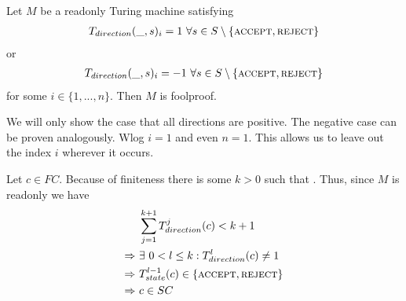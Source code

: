 \begin{Lemma} \label{turing_machines:lemma_foolproofness:lemma}
	Let $M$ be a readonly Turing machine satisfying
	\begin{align*}
		T_{direction} (\_,s)_i = 1~\forall s \in S \setminus \{\text{\scshape{accept}},\text{\scshape{reject}}\}
	\end{align*}
	or
	\begin{align*}
		T_{direction} (\_,s)_i = -1~\forall s \in S \setminus \{\text{\scshape{accept}},\text{\scshape{reject}}\}
	\end{align*}
	for some $i \in \{1,...,n\}$.
	Then $M$ is foolproof.
\end{Lemma}
\proof
We will only show the case that all directions are positive. The negative case can be proven analogously.
Wlog $i=1$ and even $n=1$. This allows us to leave out the index $i$ wherever it occurs.

Let $c \in FC$. Because of finiteness there is some $k > 0$ such that .
Thus, since $M$ is readonly we have
\begin{align*}
	&\sum_{j=1}^{k+1} T_{direction}^j (c) < k+1 \\
	\Rightarrow~&\exists~0 < l \leq k: T_{direction}^l (c) \neq 1 \\
	\Rightarrow~&T_{state}^{l-1} (c) \in \{\text{\scshape{accept}},\text{\scshape{reject}}\} \\
	\Rightarrow~&c \in SC
\end{align*}
\endproof
